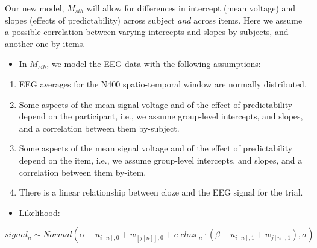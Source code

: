 \documentclass[12pt,]{krantz}
\providecommand{\tightlist}{%
  \setlength{\itemsep}{0pt}\setlength{\parskip}{0pt}}
\theoremstyle{definition}
\theoremstyle{definition}
\theoremstyle{definition}
\theoremstyle{remark}
\begin{document}
Our new model, \(M_{sih}\) will allow for differences in intercept (mean voltage) and slopes (effects of predictability) across subject \emph{and} across items. Here
we assume a possible correlation between varying intercepts and slopes by subjects, and another one by items.

\begin{itemize}
\tightlist
\item
  In \(M_{sih}\), we model the EEG data with the following assumptions:
\end{itemize}

\begin{enumerate}
\def\labelenumi{\arabic{enumi}.}
\tightlist
\item
  EEG averages for the N400 spatio-temporal window are normally distributed.
\item
  Some aspects of the mean signal voltage and of the effect of predictability depend on the participant, i.e., we assume group-level intercepts, and slopes, and a correlation between them by-subject.
\item
  Some aspects of the mean signal voltage and of the effect of predictability depend on the item, i.e., we assume group-level intercepts, and slopes, and a correlation between them by-item.
\item
  There is a linear relationship between cloze and the EEG signal for the trial.
\end{enumerate}

\begin{itemize}
\tightlist
\item
  Likelihood:
\end{itemize}

\begin{equation}
  signal_n \sim Normal(\alpha + u_{i[n],0} + w_{[j[n]],0} + c\_cloze_n \cdot  (\beta + u_{i[n],1}+ w_{j[n],1}), \sigma)
  \end{equation}
\end{document}
